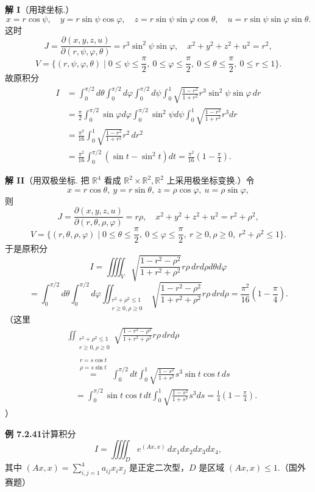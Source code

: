 \documentclass[UTF8, 12pt, fontset=fandol, oneside]{ctexart}
\providecommand{\xlongequal}[1]{\overset{#1}{=}}
\begin{document}
\noindent\textbf{解 I}\quad （用球坐标.）
\[
x=r\cos\psi,\quad y=r\sin\psi\cos\varphi,\quad
z=r\sin\psi\sin\varphi\cos\theta,\quad
u=r\sin\psi\sin\varphi\sin\theta.
\]
这时
\[
J=\frac{\partial(x,y,z,u)}{\partial(r,\psi,\varphi,\theta)}
=r^3\sin^2\psi\sin\varphi,\quad
x^2+y^2+z^2+u^2=r^2,
\]
\[
V=\{(r,\psi,\varphi,\theta)\mid 0\le\psi\le\frac\pi2,\ 0\le\varphi\le\frac\pi2,\ 0\le\theta\le\frac\pi2,\ 0\le r\le1\}.
\]
故原积分
\[
\begin{aligned}
I&=\int_0^{\pi/2}d\theta\int_0^{\pi/2}d\varphi
\int_0^{\pi/2}d\psi\int_0^1
\sqrt{\frac{1-r^2}{1+r^2}}r^3\sin^2\psi\sin\varphi\,dr\\
&=\frac\pi2\int_0^{\pi/2}\sin\varphi d\varphi
\int_0^{\pi/2}\sin^2\psi d\psi
\int_0^1\sqrt{\frac{1-r^2}{1+r^2}}r^3dr\\
&=\frac{\pi^2}{16}\int_0^1\sqrt{\frac{1-r^2}{1+r^2}}r^2\,d r^2\\
&=\frac{\pi^2}{16}\int_0^{\pi/2}(\sin t-\sin^2t)dt
=\frac{\pi^2}{16}\left(1-\frac\pi4\right).
\end{aligned}
\]

\noindent\textbf{解 II}\quad （用双极坐标. 把 $\mathbb R^4$ 看成 $\mathbb R^2\times\mathbb R^2,\mathbb R^2$ 上采用极坐标变换.）令
\[
x=r\cos\theta,\ y=r\sin\theta,\ z=\rho\cos\varphi,\ u=\rho\sin\varphi,
\]
则
\[
J=\frac{\partial(x,y,z,u)}{\partial(r,\theta,\rho,\varphi)}
=r\rho,\quad x^2+y^2+z^2+u^2=r^2+\rho^2,
\]
\[
V=\{(r,\theta,\rho,\varphi)\mid 0\le\theta\le\frac\pi2,\ 0\le\varphi\le\frac\pi2,\ r\ge0,\rho\ge0,\ r^2+\rho^2\le1\}.
\]
于是原积分
\[
I=\iiiint_V\sqrt{\frac{1-r^2-\rho^2}{1+r^2+\rho^2}}r\rho\,drd\rho d\theta d\varphi
\]
\[
=\int_0^{\pi/2}d\theta\int_0^{\pi/2}d\varphi
\iint_{\substack{r^2+\rho^2\le1\\r\ge0,\rho\ge0}}
\sqrt{\frac{1-r^2-\rho^2}{1+r^2+\rho^2}}r\rho\,drd\rho
=\frac{\pi^2}{16}\left(1-\frac\pi4\right).
\]
（这里
\[
\begin{aligned}
&\iint_{\substack{r^2+\rho^2\le1\\r\ge0,\rho\ge0}}
\sqrt{\frac{1-r^2-\rho^2}{1+r^2+\rho^2}}r\rho\,drd\rho\\
&\quad\xlongequal{\substack{r=s\cos t\\\rho=s\sin t}}
\int_0^{\pi/2}dt\int_0^1
\sqrt{\frac{1-s^2}{1+s^2}}s^3\sin t\cos t\,ds\\
&\quad=\int_0^{\pi/2}\sin t\cos t\,dt
\int_0^1\sqrt{\frac{1-s^2}{1+s^2}}s^3ds
=\frac14\left(1-\frac\pi4\right).
\end{aligned}
\]
）

\noindent\textbf{例 7.2.41}\quad 计算积分
\[
I=\iiiint_D e^{(Ax,x)}\,dx_1dx_2dx_3dx_4,
\]
其中 $(Ax,x)=\displaystyle\sum_{i,j=1}^4a_{ij}x_ix_j$ 是正定二次型，$D$ 是区域 $(Ax,x)\le1$.（国外赛题）
\end{document}
